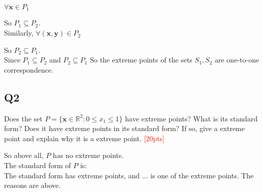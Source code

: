\documentclass[10pt]{article}
\renewcommand{\mathbf}{\boldsymbol}
\begin{document}
$\forall\mathbf{x}\in P_1$





So $P_1\subseteq P_2$.\\

Similarly, $\forall(\mathbf{x},\mathbf{y})\in P_2$





So $P_2\subseteq P_1$.\\

Since $P_1\subseteq P_2$ and $P_2\subseteq P_1$
So the extreme points of the sets $S_1,S_2$ are one-to-one correspondence.\\

\newpage
\subsection{Q2}
Does the set $P = \{ \bm{x} \in \mathbb{R}^{2} : 0 \leq x_{1} \leq 1 \}$ have extreme points? What is its standard form? Does it have extreme points in its standard form? If so, give a extreme point and explain why it is a extreme point.
\textcolor{red}{[20pts]}







So above all, $P$ has no extreme points.\\
The standard form of $P$ is:\\


The standard form has extreme points, and $...$ is one of the extreme points. The reasons are above.\\
\end{document}
